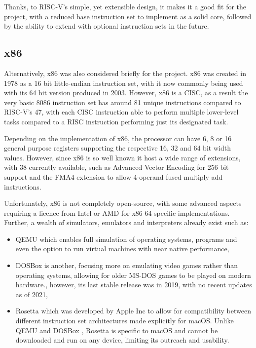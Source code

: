 Thanks, to RISC-V's simple, yet extensible design, it makes it a good fit for the project, with a reduced base instruction set to implement as a solid core, followed by the ability to extend with optional instruction sets in the future.

\subsection{x86}
Alternatively, x86 was also considered briefly for the project. x86 \cite{intelcorporation_2023_intel} was created in 1978 as a 16 bit little-endian instruction set, with it now commonly being used with its 64 bit version produced in 2003. However, x86 is a \ac{CISC}, as a result the very basic 8086 \cite{amd_1989_8086} instruction set has around 81 unique instructions compared to RISC-V's 47, with each \ac{CISC} instruction able to perform multiple lower-level tasks compared to a \ac{RISC} instruction performing just its designated task.

Depending on the implementation of x86, the processor can have 6, 8 or 16 general purpose registers supporting the respective 16, 32 and 64 bit width values. However, since x86 \cite{intelcorporation_2023_intel} is so well known it host a wide range of extensions, with 38 currently available, such as Advanced Vector Encoding for 256 bit support and the FMA4 extension to allow 4-operand fused multiply add instructions.

Unfortunately, x86 is not completely open-source, with some advanced aspects requiring a licence from Intel or AMD for x86-64 specific implementations. Further, a wealth of simulators, emulators and interpreters already exist such as:
\begin{itemize}
    \item QEMU \cite{bellard_2023_qemu} which enables full simulation of operating systems, programs and even the option to run virtual machines with near native performance,
    \item DOSBox \cite{dosbox_2021_dosbox} is another, focusing more on emulating video games rather than operating systems, allowing for older MS-DOS games to be played on modern hardware., however, its last stable release was in 2019, with no recent updates as of 2021,
    \item Rosetta \cite{appleinc_2023_about} which was developed by Apple Inc to allow for compatibility between different instruction set architectures made explicitly for macOS. Unlike QEMU \cite{bellard_2023_qemu} and DOSBox \cite{dosbox_2021_dosbox}, Rosetta is specific to macOS and cannot be downloaded and run on any device, limiting its outreach and usability.
\end{itemize}



